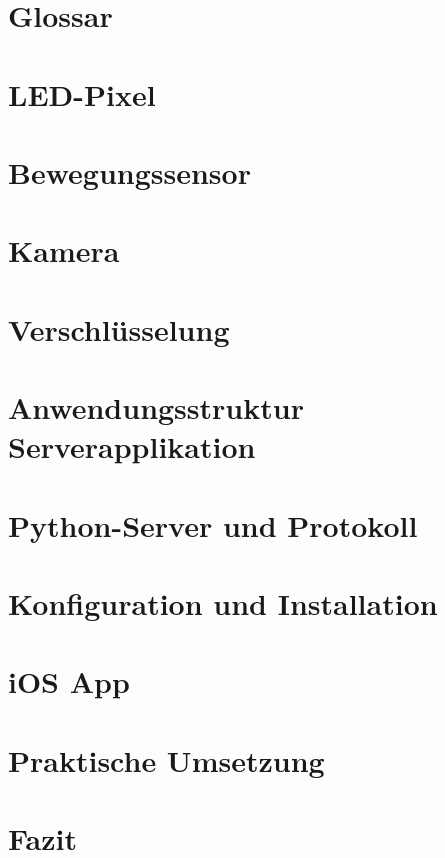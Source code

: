 


\begin{titlepage}



\end{titlepage}

\thispagestyle{empty} %
\tableofcontents
\thispagestyle{empty}  
\pagebreak

\section{Glossar} 
\pagebreak


\section{LED-Pixel} 
\section{Bewegungssensor} 
\section{Kamera}
\section{Verschlüsselung}
\section{Anwendungsstruktur Serverapplikation}
\section{Python-Server und Protokoll} 
\section{Konfiguration und Installation}
\section{iOS App}
\section{Praktische Umsetzung}
\section{Fazit}





 

 